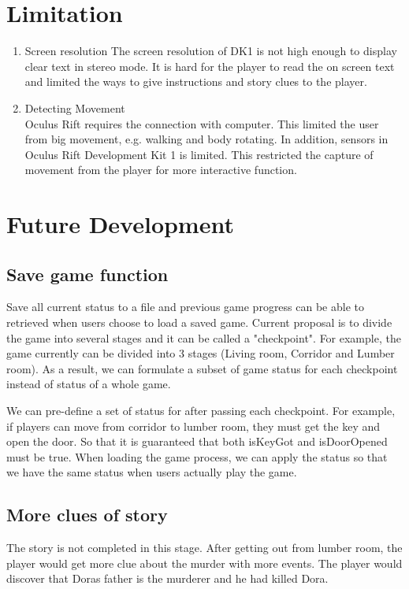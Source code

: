 \documentclass{article}
\begin{document}
\section{Limitation}
\begin{enumerate}
\item Screen resolution
The screen resolution of DK1 is not high enough to display clear text in stereo mode. It is hard for the player to read the on screen text and limited the ways to give instructions and story clues to the player.
\item Detecting Movement\\
Oculus Rift requires the connection with computer. This limited the user from big movement, e.g. walking and body rotating.
In addition, sensors in Oculus Rift Development Kit 1 is limited. This restricted the capture of movement from the player for more interactive function.

\end{enumerate}

\section{Future Development}

\subsection{Save game function}

Save all current status to a file and previous game progress can be able to retrieved when users choose to load a saved game. Current proposal is to divide the game into several stages and it can be called a "checkpoint". For example, the game currently can be divided into 3 stages (Living room, Corridor and Lumber room). As a result, we can formulate a subset of game status for each checkpoint instead of status of a whole game. 

We can pre-define a set of status for after passing each checkpoint. For example, if players can move from corridor to lumber room, they must get the key and open the door. So that it is guaranteed that both isKeyGot and isDoorOpened must be true. When loading the game process, we can apply the status so that we have the same status when users actually play the game.

\subsection{More clues of story}
The story is not completed in this stage. After getting out from lumber room, the player would get more clue about the murder with more events. The player would discover that Dora\textsc{}s father is the murderer and he had killed Dora.
\end{document}

